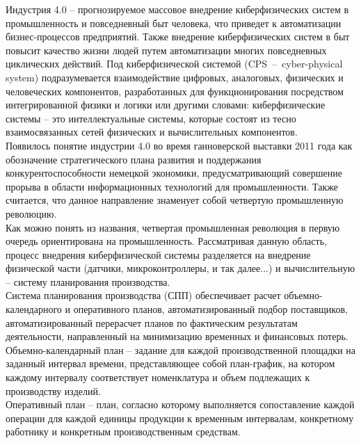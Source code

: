 Индустрия 4.0 -- прогнозируемое массовое внедрение киберфизических систем в промышленность и повседневный быт человека, что приведет к автоматизации бизнес-процессов предприятий.
Также внедрение киберфизических систем в быт повысит качество жизни людей путем автоматизации многих повседневных циклических действий.
Под киберфизической системой (CPS~--~cyber-physical system) подразумевается взаимодействие цифровых, аналоговых, физических и человеческих компонентов, разработанных для функционирования посредством интегрированной физики и логики или другими словами: киберфизические системы -- это интеллектуальные системы, которые состоят из тесно взаимосвязанных сетей физических и вычислительных компонентов\cite{nist}.\\
\indent Появилось понятие индустрии 4.0 во время ганноверской выставки 2011 года как обозначение стратегического плана развития и поддержания конкурентоспособности немецкой экономики, предусматривающий совершение прорыва в области информационных технологий для промышленности.
Также считается, что данное направление знаменует собой четвертую промышленную революцию\cite{industry}.\\
\indent Как можно понять из названия, четвертая промышленная революция в первую очередь ориентирована на промышленность.
Рассматривая данную область, процесс внедрения киберфизической системы разделяется на внедрение физической части (датчики, микроконтроллеры, и так далее...) и вычислительную -- систему планирования производства.\\
\indent Система планирования производства (СПП) обеспечивает расчет объемно-календарного и оперативного планов, автоматизированный подбор поставщиков, автоматизированный перерасчет планов по фактическим результатам деятельности, направленный на минимизацию временных и финансовых потерь.\\
\indent Объемно-календарный план -- задание для каждой производственной площадки на заданный интервал времени, представляющее собой план-график, на котором каждому интервалу соответствует номенклатура и объем подлежащих к производству изделий\cite{niokr}.\\
\indent Оперативный план -- план, согласно которому выполняется сопоставление каждой операции для каждой единицы продукции к временным интервалам, конкретному работнику и конкретным производственным средствам\cite{niokr}.\\
